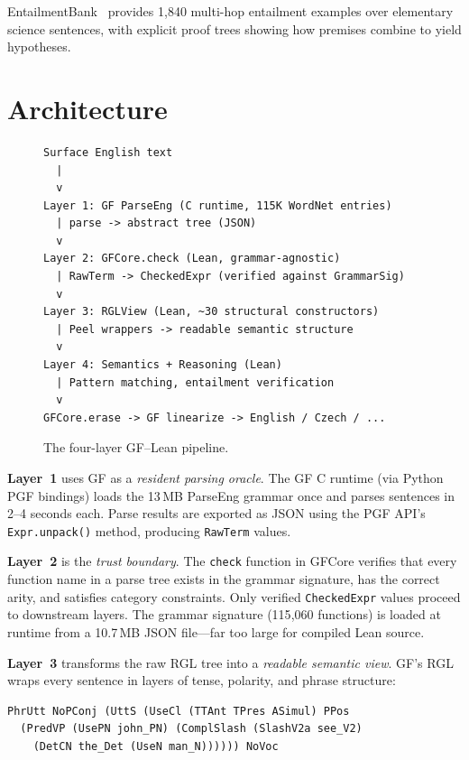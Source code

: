 \documentclass[]{article}
\newcommand{\code}[1]{\texttt{#1}}
\newcommand{\GFCore}{\textup{GFCore}}
\begin{document}
EntailmentBank~\cite{dalvi2021entailmentbank} provides 1{,}840 multi-hop
entailment examples over elementary science sentences, with explicit
proof trees showing how premises combine to yield hypotheses.

\section{Architecture}
\label{sec:architecture}

\begin{figure}[h]
\begin{lstlisting}
Surface English text
  |
  v
Layer 1: GF ParseEng (C runtime, 115K WordNet entries)
  | parse -> abstract tree (JSON)
  v
Layer 2: GFCore.check (Lean, grammar-agnostic)
  | RawTerm -> CheckedExpr (verified against GrammarSig)
  v
Layer 3: RGLView (Lean, ~30 structural constructors)
  | Peel wrappers -> readable semantic structure
  v
Layer 4: Semantics + Reasoning (Lean)
  | Pattern matching, entailment verification
  v
GFCore.erase -> GF linearize -> English / Czech / ...
\end{lstlisting}
\caption{The four-layer GF--Lean pipeline.}
\label{fig:pipeline}
\end{figure}

\textbf{Layer~1} uses GF as a \emph{resident parsing oracle}. The
GF C runtime (via Python PGF bindings) loads the 13\,MB ParseEng
grammar once and parses sentences in 2--4 seconds each. Parse results
are exported as JSON using the PGF API's \code{Expr.unpack()} method,
producing \code{RawTerm} values.

\textbf{Layer~2} is the \emph{trust boundary}. The \code{check} function
in \GFCore{} verifies that every function name in a parse tree exists in
the grammar signature, has the correct arity, and satisfies category
constraints. Only verified \code{CheckedExpr} values proceed to
downstream layers. The grammar signature (115{,}060 functions) is loaded
at runtime from a 10.7\,MB JSON file---far too large for compiled
Lean source.

\textbf{Layer~3} transforms the raw RGL tree into a \emph{readable
semantic view}. GF's RGL wraps every sentence in layers of tense,
polarity, and phrase structure:

\begin{lstlisting}
PhrUtt NoPConj (UttS (UseCl (TTAnt TPres ASimul) PPos
  (PredVP (UsePN john_PN) (ComplSlash (SlashV2a see_V2)
    (DetCN the_Det (UseN man_N)))))) NoVoc
\end{lstlisting}
\end{document}
